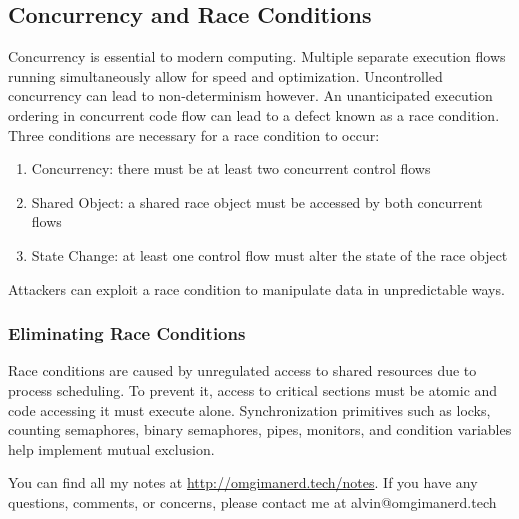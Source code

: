 \documentclass{math}
\begin{document}
\subsection*{Concurrency and Race Conditions}
Concurrency is essential to modern computing. Multiple separate execution flows
running simultaneously allow for speed and optimization. Uncontrolled
concurrency can lead to non-determinism however. An unanticipated execution
ordering in concurrent code flow can lead to a defect known as a race condition.
Three conditions are necessary for a race condition to occur:
\begin{enumerate}
  \item Concurrency: there must be at least two concurrent control flows
  \item Shared Object: a shared race object must be accessed by both concurrent
  flows
  \item State Change: at least one control flow must alter the state of the race
  object
\end{enumerate}
Attackers can exploit a race condition to manipulate data in unpredictable ways.

\subsubsection*{Eliminating Race Conditions}
Race conditions are caused by unregulated access to shared resources due to
process scheduling. To prevent it, access to critical sections must be atomic
and code accessing it must execute alone. Synchronization primitives such as
locks, counting semaphores, binary semaphores, pipes, monitors, and
condition variables help implement mutual exclusion.

\begin{center}
  You can find all my notes at \url{http://omgimanerd.tech/notes}. If you have
  any questions, comments, or concerns, please contact me at
  alvin@omgimanerd.tech
\end{center}
\end{document}
